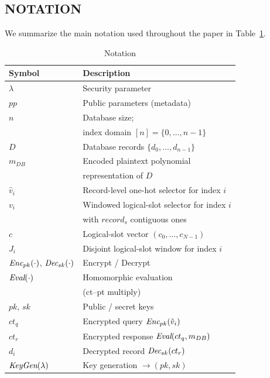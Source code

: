 \documentclass{ieeetj}
\begin{document}
\subsection{NOTATION}
We summarize the main notation used throughout the paper in Table~\ref{tab:notation}.

\begin{table}[!ht]
\caption{Notation}
\label{tab:notation}
\setlength{\tabcolsep}{6pt}
\renewcommand{\arraystretch}{1.1}
    \begin{tabular}{|l|l|}
    \hline
    \textbf{Symbol} & \textbf{Description} \\
    \hline
    $\lambda$ & Security parameter \\
    \hline
    $pp$ & Public parameters (metadata) \\
    \hline
    $n$ & Database size; \\ & index domain $[n]=\{0,\dots,n-1\}$ \\
    \hline
    $D$ & Database records $\{d_0,\dots,d_{n-1}\}$ \\
    \hline
    \emph{$m_{DB}$} & Encoded plaintext polynomial \\ & representation of $D$ \\
    \hline
    $\hat{v}_i$ & Record-level one-hot selector for index $i$ \\
    \hline
    ${v}_i$ & Windowed logical-slot selector for index $i$ \\ & with $record_s$ contiguous ones \\
    \hline
    ${c}$ & Logical-slot vector $(c_0,\dots,c_{N-1})$ \\
    \hline
    $J_i$ & Disjoint logical-slot window for index $i$ \\
    \hline
    $\emph{Enc}_{pk}(\cdot)$, $\emph{Dec}_{sk}(\cdot)$ & Encrypt / Decrypt \\
    \hline
    $\emph{Eval}(\cdot)$ & Homomorphic evaluation \\ & (ct–pt multiply) \\
    \hline
    $pk,\, sk$ & Public / secret keys \\
    \hline
    $ct_q$ & Encrypted query $\emph{Enc}_{pk}(\hat{v}_i)$ \\
    \hline
    $ct_r$ & Encrypted response $\emph{Eval}(ct_q, \emph{$m_{DB}$})$ \\
    \hline
    $d_i$ & Decrypted record $\emph{Dec}_{sk}(ct_r)$  \\
    \hline
    $\emph{KeyGen}(\lambda)$ & Key generation $\!\to\!(pk,sk)$ \\

\end{tabular}
\end{table}
\end{document}
